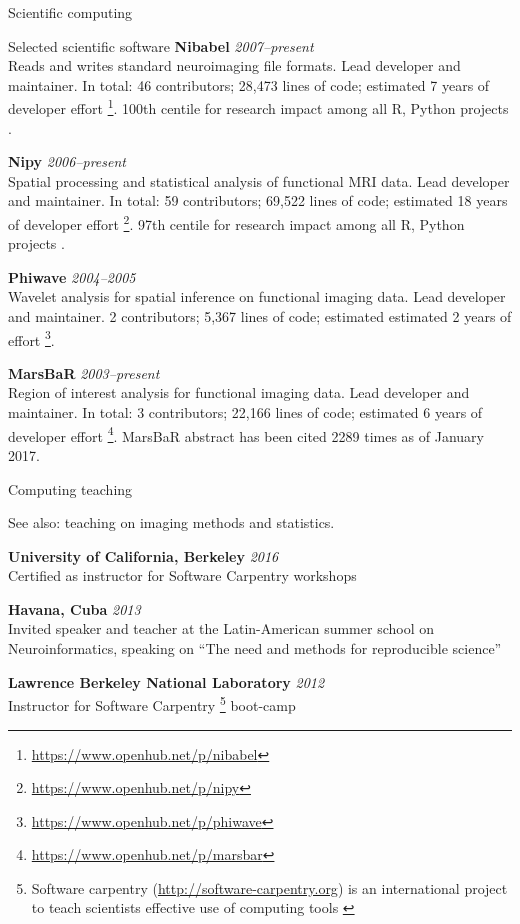 \documentclass{cv}
\newcommand{\PlaceDateNote}[3]{{\bf #1} \hfill {\em #2} \\#3}
\newcommand{\UCB}{University of California, Berkeley}
\begin{document}
\begin{cvSection}{Scientific computing}
\begin{cvSubSection}{Selected scientific software}
\PlaceDateNote{Nibabel}{2007--present}
{Reads and writes standard neuroimaging file
    formats.  Lead developer and maintainer.  In total: 46 contributors;
    28,473 lines of code; estimated 7 years of developer effort
    \footnote{\url{https://www.openhub.net/p/nibabel}}.  100th centile for
    research impact among all R, Python projects .}

\PlaceDateNote{Nipy}{2006--present}
{Spatial processing and statistical analysis
of functional MRI data.  Lead developer and maintainer.  In total: 59
contributors; 69,522 lines of code; estimated 18 years of developer effort
\footnote{\url{https://www.openhub.net/p/nipy}}.  97th centile for research
impact among all R, Python projects \footref{depsy}.}

\PlaceDateNote{Phiwave}{2004--2005}
{Wavelet analysis for spatial inference on
functional imaging data.  Lead developer and maintainer.  2 contributors;
5,367 lines of code; estimated estimated 2 years of effort
\footnote{\url{https://www.openhub.net/p/phiwave}}.}

\PlaceDateNote{MarsBaR}{2003--present}
{Region of interest analysis for functional
    imaging data.  Lead developer and maintainer.  In total: 3 contributors;
22,166 lines of code; estimated 6 years of developer effort
\footnote{\url{https://www.openhub.net/p/marsbar}}.  MarsBaR abstract has been
cited 2289 times as of January 2017.}

\end{cvSubSection}

\begin{cvSubSection}{Computing teaching}

See also: teaching on imaging methods and statistics.

\PlaceDateNote{\UCB}{2016}
{Certified as instructor for Software Carpentry workshops }

\PlaceDateNote{Havana, Cuba}{2013}
{Invited speaker and teacher at the Latin-American summer school on
Neuroinformatics, speaking on ``The need and methods for reproducible
science''}

\PlaceDateNote{Lawrence Berkeley National Laboratory}{2012}
{Instructor for Software Carpentry
    \footnote{
        Software carpentry (\url{http://software-carpentry.org}) is an
        international project to teach scientists effective use of computing
        tools
\label{swc}}
boot-camp}

\end{cvSubSection}


\end{cvSection}
\end{document}
